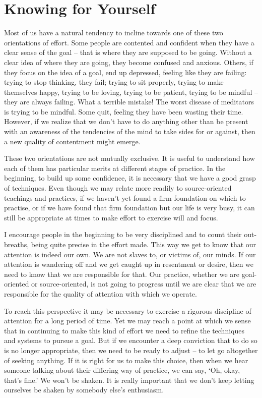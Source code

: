 \section{Knowing for Yourself}

Most of us have a natural tendency to incline towards one of these two
orientations of effort. Some people are contented and confident when
they have a clear sense of the goal -- that is where they are supposed
to be going. Without a clear idea of where they are going, they become
confused and anxious. Others, if they focus on the idea of a goal, end
up depressed, feeling like they are failing: trying to stop thinking,
they fail; trying to sit properly, trying to make themselves happy,
trying to be loving, trying to be patient, trying to be mindful -- they
are always failing. What a terrible mistake! The worst disease of
meditators is trying to be mindful. Some quit, feeling they have been
wasting their time. However, if we realize that we don't have to do
anything other than be present with an awareness of the tendencies of
the mind to take sides for or against, then a new quality of contentment might emerge.

These two orientations are not mutually exclusive. It is useful to
understand how each of them has particular merits at different stages of
practice. In the beginning, to build up some confidence, it is necessary
that we have a good grasp of techniques. Even though we may relate more
readily to source-oriented teachings and practices, if we haven't yet
found a firm foundation on which to practise, or if we have found that
firm foundation but our life is very busy, it can still be appropriate
at times to make effort to exercise will and focus.

I encourage people in the beginning to be very disciplined and to count
their out-breaths, being quite precise in
the effort made. This way we get to know that our attention is indeed
our own. We are not slaves to, or victims of, our minds. If our
attention is wandering off and we get caught up in resentment or desire,
then we need to know that we are responsible for that. Our practice,
whether we are goal-oriented or source-oriented, is not going to
progress until we are clear that we are responsible for the quality of
attention with which we operate.

To reach this perspective it may be necessary to exercise a rigorous
discipline of attention for a long period of time. Yet we may reach a
point at which we sense that in continuing to make this kind of effort
we need to refine the techniques and systems to pursue a goal. But if we
encounter a deep conviction that to do so is no longer appropriate, then
we need to be ready to adjust -- to let go altogether of seeking
anything. If it is right for us to make this choice, then when we hear
someone talking about their differing way of practice, we can say, `Oh,
okay, that's fine.' We won't be shaken. It is really important that we
don't keep letting ourselves be shaken by somebody else's enthusiasm.

